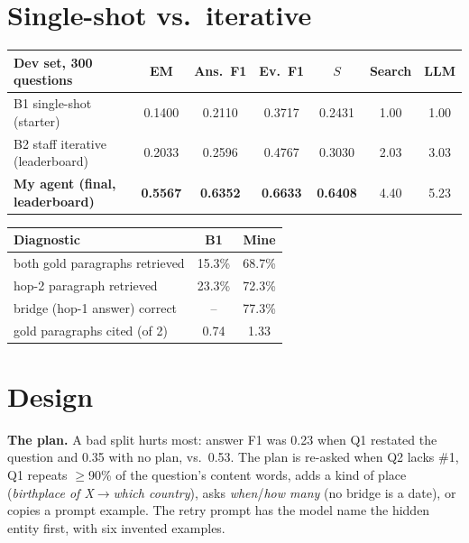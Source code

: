 \documentclass[10pt,a4paper]{article}
\begin{document}
\section{Single-shot vs.\ iterative}
\begin{minipage}[t]{0.585\textwidth}
\vspace{0pt}
\centering\footnotesize
\begin{tabular}{@{}lcccccc@{}}
\toprule
Dev set, 300 questions & EM & Ans.\ F1 & Ev.\ F1 & $S$ & Search & LLM\\
\midrule
B1 single-shot (starter) & 0.1400 & 0.2110 & 0.3717 & 0.2431 & 1.00 & 1.00\\
B2 staff iterative (leaderboard) & 0.2033 & 0.2596 & 0.4767 & 0.3030 & 2.03 & 3.03\\
\textbf{My agent (final, leaderboard)} & \textbf{0.5567} & \textbf{0.6352} & \textbf{0.6633} & \textbf{0.6408} & 4.40 & 5.23\\
\bottomrule
\end{tabular}
\label{tab:main}
\end{minipage}\hfill
\begin{minipage}[t]{0.395\textwidth}
\vspace{0pt}
\centering\footnotesize
\begin{tabular}{@{}lcc@{}}
\toprule
Diagnostic & B1 & Mine\\
\midrule
both gold paragraphs retrieved & 15.3\% & 68.7\%\\
hop-2 paragraph retrieved & 23.3\% & 72.3\%\\
bridge (hop-1 answer) correct & -- & 77.3\%\\
gold paragraphs cited (of 2) & 0.74 & 1.33\\
\bottomrule
\end{tabular}
\end{minipage}


\section{Design}
\textbf{The plan.} A bad split hurts most: answer F1 was 0.23 when Q1 restated the question and 0.35 with no
plan, vs.\ 0.53. The plan is re-asked when Q2 lacks \#1, Q1 repeats $\ge$90\% of the question's content words, adds
a kind of place (\emph{birthplace of X}$\to$\emph{which country}), asks \emph{when}/\emph{how many} (no bridge is a
date), or copies a prompt example. The retry prompt has the model name the hidden entity first, with six invented examples.
\end{document}
